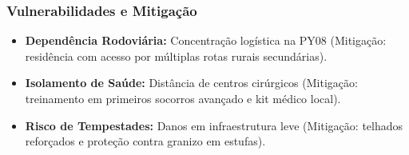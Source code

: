 \subsubsection{Vulnerabilidades e
Mitigação}

\begin{itemize}
\tightlist
\item
  \textbf{Dependência Rodoviária:} Concentração logística na PY08
  (Mitigação: residência com acesso por múltiplas rotas rurais
  secundárias).
\item
  \textbf{Isolamento de Saúde:} Distância de centros cirúrgicos
  (Mitigação: treinamento em primeiros socorros avançado e kit médico
  local).
\item
  \textbf{Risco de Tempestades:} Danos em infraestrutura leve
  (Mitigação: telhados reforçados e proteção contra granizo em estufas).
\end{itemize}

